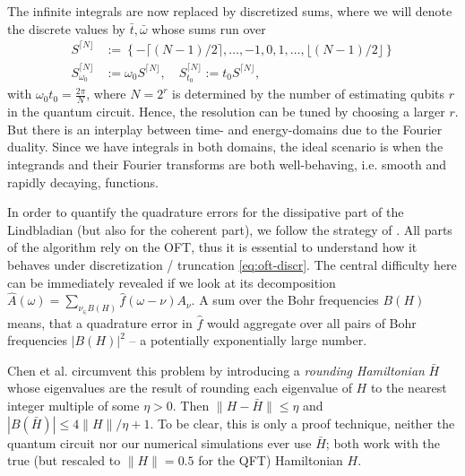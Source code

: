 The infinite integrals are now replaced by discretized sums, where we will denote the discrete values by $\bar{t}, \bar{\omega}$ whose sums run over
\begin{equation*}
    \begin{split}
    S^{\lceil N \rfloor} &:= \left\{-\lceil(N-1)/2\rceil, \dots, -1, 0, 1, \dots, \lfloor (N - 1) / 2 \rfloor\right\} \\
    S^{\lceil N \rfloor}_{\omega_0} &:= \omega_0 S^{\lceil N \rfloor}, \quad S^{\lceil N \rfloor}_{t_0} := t_0 S^{\lceil N \rfloor},
\end{split}
\end{equation*}
with $\omega_0t_0 = \frac{2\pi}{N}$, where $N = 2^r$ is determined by the number of estimating qubits $r$ in the quantum circuit. Hence, the resolution can be tuned by choosing a larger $r$. But there is an interplay between time- and energy-domains due to the Fourier duality. Since we have integrals in both domains, the ideal scenario is when the integrands and their Fourier transforms are both well-behaving, i.e. smooth and rapidly decaying, functions.

In order to quantify the quadrature errors for the dissipative part of the Lindbladian (but also for the coherent part), we follow the strategy of \cite[Appendix C]{chen2023quantum}. All parts of the algorithm rely on the OFT, thus it is essential to understand how it behaves under discretization / truncation \eqref{eq:oft-discr}. The central difficulty here can be immediately revealed if we look at its decomposition $\hat{A}(\omega) = \sum_{\nu_\in B(H)} \hat{f}(\omega - \nu) A_\nu$. A sum over the Bohr frequencies $B(H)$ means, that a quadrature error in $\hat{f}$ would aggregate over all pairs of Bohr frequencies $|B(H)|^2$ -- a potentially exponentially large number. 

Chen et al. circumvent this problem by introducing a \emph{rounding Hamiltonian} $\bar{H}$ whose eigenvalues are the result of rounding each eigenvalue of $H$ to the nearest integer multiple of some $\eta >0$. Then $\|H - \bar{H}\| \leq \eta$ and $|B(\bar{H})| \leq 4 \|H\| / \eta + 1$. To be clear, this is only a proof technique, neither the quantum circuit nor our numerical simulations ever use $\bar{H}$; both work with the true (but rescaled to $\|H\| = 0.5$ for the QFT) Hamiltonian $H$.

